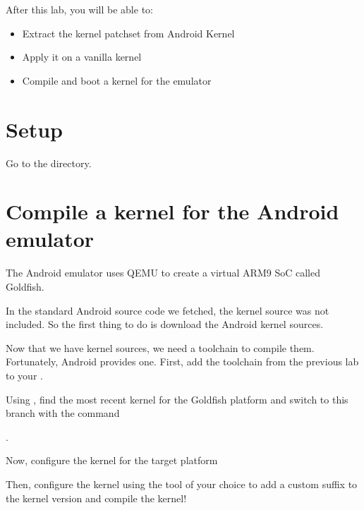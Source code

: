 
After this lab, you will be able to:
\begin{itemize}
  \item Extract the kernel patchset from Android Kernel
  \item Apply it on a vanilla kernel
  \item Compile and boot a kernel for the emulator
\end{itemize}

\section{Setup}

Go to the  directory.

\section{Compile a kernel for the Android emulator}

The Android emulator uses QEMU to create a virtual ARM9 SoC called Goldfish.

In the standard Android source code we fetched, the kernel source was not included.
So the first thing to do is download the Android kernel sources.


Now that we have kernel sources, we need a toolchain to compile them. Fortunately,
Android provides one. First, add the toolchain from the previous lab to your .


Using , find the most recent kernel for the Goldfish platform
and switch to this branch with the command 

.

Now, configure the kernel for the target platform


Then, configure the kernel using the tool of your choice to add a custom suffix
to the kernel version and compile the kernel!


